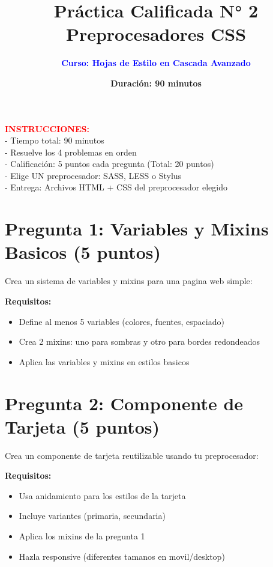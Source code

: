 \documentclass[12pt, a4paper]{article}
\title{\textbf{Práctica Calificada N° 2 \\ Preprocesadores CSS}}
\author{\textcolor{blue}{\textbf{Curso: Hojas de Estilo en Cascada Avanzado}}}
\date{\textbf{Duración: 90 minutos}}
\newcommand{\pregunta}[2]{
    \section*{Pregunta #1: #2}
    \vspace{0.3em}
}
\newcommand{\instrucciones}{
    \noindent\colorbox{red!10}{
        \parbox{\dimexpr\textwidth-2\fboxsep}{
            \textbf{\textcolor{red}{INSTRUCCIONES:}} \\
            - Tiempo total: 90 minutos \\
            - Resuelve los 4 problemas en orden \\
            - Calificación: 5 puntos cada pregunta (Total: 20 puntos) \\
            - Elige UN preprocesador: SASS, LESS o Stylus \\
            - Entrega: Archivos HTML + CSS del preprocesador elegido
        }
    }
    \vspace{1em}
}
\begin{document}
\maketitle

\instrucciones

\pregunta{1}{Variables y Mixins Basicos (5 puntos)}
Crea un sistema de variables y mixins para una pagina web simple:

\textbf{Requisitos:}
\begin{itemize}
\item Define al menos 5 variables (colores, fuentes, espaciado)
\item Crea 2 mixins: uno para sombras y otro para bordes redondeados
\item Aplica las variables y mixins en estilos basicos
\end{itemize}





\pregunta{2}{Componente de Tarjeta (5 puntos)}
Crea un componente de tarjeta reutilizable usando tu preprocesador:

\textbf{Requisitos:}
\begin{itemize}
\item Usa anidamiento para los estilos de la tarjeta
\item Incluye variantes (primaria, secundaria)
\item Aplica los mixins de la pregunta 1
\item Hazla responsive (diferentes tamanos en movil/desktop)
\end{itemize}

\end{document}
